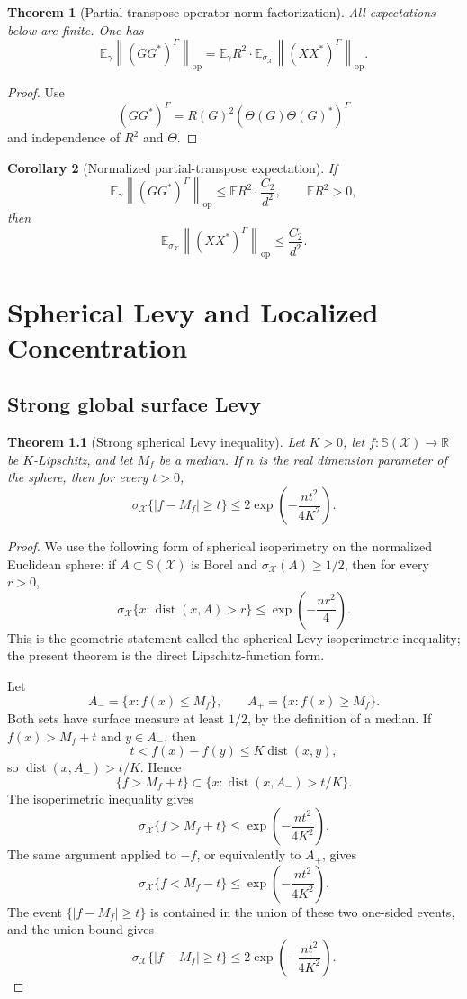 \documentclass[11pt,oneside]{book}
\newtheorem{theorem}{Theorem}[chapter]
\newtheorem{corollary}[theorem]{Corollary}
\DeclareMathOperator{\dist}{dist}
\newcommand{\R}{\mathbb R}
\newcommand{\E}{\mathbb E}
\newcommand{\1}{\mathbf 1}
\newcommand{\Sphere}{\mathbb S}
\newcommand{\pt}{\Gamma}
\newcommand{\op}{\mathrm{op}}
\newcommand{\norm}[1]{\left\|#1\right\|}
\begin{document}
\begin{theorem}[Partial-transpose operator-norm factorization]
All expectations below are finite.  One has
\[
  \E_\gamma\norm{(GG^*)^\pt}_{\op}
  =
  \E_\gamma R^2\cdot
  \E_{\sigma_{\mathcal X}}\norm{(XX^*)^\pt}_{\op}.
\]
\end{theorem}

\begin{proof}
Use
\[
  (GG^*)^\pt=R(G)^2(\Theta(G)\Theta(G)^*)^\pt
\]
and independence of \(R^2\) and \(\Theta\).
\end{proof}

\begin{corollary}[Normalized partial-transpose expectation]
If
\[
  \E_\gamma\norm{(GG^*)^\pt}_{\op}
  \le \E R^2\cdot \frac{C_2}{d^2},
  \qquad \E R^2>0,
\]
then
\[
  \E_{\sigma_{\mathcal X}}\norm{(XX^*)^\pt}_{\op}\le \frac{C_2}{d^2}.
\]
\end{corollary}

\chapter{Spherical Levy and Localized Concentration}

\section{Strong global surface Levy}

\begin{theorem}[Strong spherical Levy inequality]
Let \(K>0\), let \(f:\Sphere(\mathcal X)\to\R\) be \(K\)-Lipschitz, and let
\(M_f\) be a median.  If \(n\) is the real dimension parameter of the sphere,
then for every \(t>0\),
\[
  \sigma_{\mathcal X}\{|f-M_f|\ge t\}
  \le
  2\exp\left(-\frac{n t^2}{4K^2}\right).
\]
\end{theorem}

\begin{proof}
We use the following form of spherical isoperimetry on the normalized
Euclidean sphere: if \(A\subset\Sphere(\mathcal X)\) is Borel and
\(\sigma_{\mathcal X}(A)\ge1/2\), then for every \(r>0\),
\[
  \sigma_{\mathcal X}\{x:\dist(x,A)>r\}
  \le
  \exp\left(-\frac{n r^2}{4}\right).
\]
This is the geometric statement called the spherical Levy isoperimetric
inequality; the present theorem is the direct Lipschitz-function form.

Let
\[
  A_-=\{x:f(x)\le M_f\},\qquad A_+=\{x:f(x)\ge M_f\}.
\]
Both sets have surface measure at least \(1/2\), by the definition of a
median.  If \(f(x)>M_f+t\) and \(y\in A_-\), then
\[
  t< f(x)-f(y)\le K\dist(x,y),
\]
so \(\dist(x,A_-)>t/K\).  Hence
\[
  \{f>M_f+t\}\subset \{x:\dist(x,A_-)>t/K\}.
\]
The isoperimetric inequality gives
\[
  \sigma_{\mathcal X}\{f>M_f+t\}
  \le
  \exp\left(-\frac{n t^2}{4K^2}\right).
\]
The same argument applied to \(-f\), or equivalently to \(A_+\), gives
\[
  \sigma_{\mathcal X}\{f<M_f-t\}
  \le
  \exp\left(-\frac{n t^2}{4K^2}\right).
\]
The event \(\{|f-M_f|\ge t\}\) is contained in the union of these two one-sided
events, and the union bound gives
\[
  \sigma_{\mathcal X}\{|f-M_f|\ge t\}
  \le
  2\exp\left(-\frac{n t^2}{4K^2}\right).
\]
\end{proof}
\end{document}
